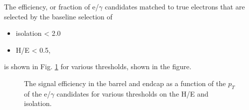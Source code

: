 The efficiency, or fraction of e/$\gamma$ candidates matched to true electrons that are selected by the baseline selection of 
\begin{itemize}
\item isolation < 2.0
\item H/E < 0.5,
\end{itemize}
is shown in Fig. \ref{fig:EGammaEfficiencies} for various thresholds, shown in the figure.
\begin{figure}[h]
\caption{The signal efficiency in the barrel and endcap as a function of the $p_T$ of the e/$\gamma$ candidates for various thresholds on the H/E and isolation.} 
\label{fig:EGammaEfficiencies}
\end{figure}

